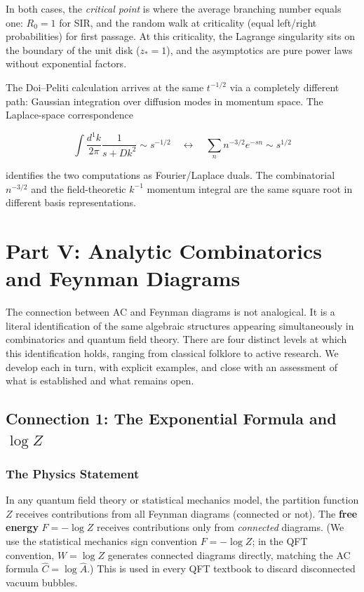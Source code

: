\documentclass[11pt,a4paper]{article}
\theoremstyle{definition}
\begin{document}
In both cases, the \emph{critical point} is where the average branching number
equals one: $R_0 = 1$ for SIR, and the random walk at criticality (equal left/right
probabilities) for first passage. At this criticality, the Lagrange singularity
sits on the boundary of the unit disk ($z_* = 1$), and the asymptotics are pure
power laws without exponential factors.

The Doi--Peliti calculation arrives at the same $t^{-1/2}$ via a completely
different path: Gaussian integration over diffusion modes in momentum space.
The Laplace-space correspondence

\[
  \int \frac{d^1k}{2\pi} \frac{1}{s + Dk^2} \sim s^{-1/2}
  \quad\longleftrightarrow\quad
  \sum_n n^{-3/2} e^{-sn} \sim s^{1/2}
\]

identifies the two computations as Fourier/Laplace duals. The combinatorial
$n^{-3/2}$ and the field-theoretic $k^{-1}$ momentum integral are the same
square root in different basis representations.

\clearpage

\section{Part V: Analytic Combinatorics and Feynman Diagrams}
\label{sec:feynman}

\begin{keybox}
The connection between AC and Feynman diagrams is not analogical.
It is a literal identification of the same algebraic structures
appearing simultaneously in combinatorics and quantum field theory.
There are four distinct levels at which this identification holds,
ranging from classical folklore to active research.
We develop each in turn, with explicit examples, and close with
an assessment of what is established and what remains open.
\end{keybox}

\subsection{Connection 1: The Exponential Formula and $\log Z$}
\label{sec:expformula}

\subsubsection{The Physics Statement}

In any quantum field theory or statistical mechanics model, the partition
function $Z$ receives contributions from all Feynman diagrams (connected or not).
The \textbf{free energy} $F = -\log Z$ receives contributions only from
\emph{connected} diagrams. (We use the statistical mechanics sign convention
$F = -\log Z$; in the QFT convention, $W = \log Z$ generates connected diagrams
directly, matching the AC formula $\hat{C} = \log \hat{A}$.)
This is used in every QFT textbook to discard
disconnected vacuum bubbles.
\end{document}
